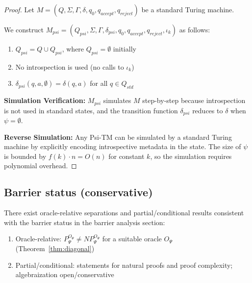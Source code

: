 \begin{proof}
Let $M = (Q, \Sigma, \Gamma, \delta, q_0, q_{accept}, q_{reject})$ be a standard Turing machine.

We construct $M_{psi} = (Q_{psi}, \Sigma, \Gamma, \delta_{psi}, q_0, q_{accept}, q_{reject}, \iota_k)$ as follows:

\begin{enumerate}
\item $Q_{psi} = Q \cup Q_{psi}$, where $Q_{psi} = \emptyset$ initially
\item No introspection is used (no calls to $\iota_k$)
\item $\delta_{psi}(q, a, \emptyset) = \delta(q, a)$ for all $q \in Q_{std}$
\end{enumerate}

\textbf{Simulation Verification:} 
$M_{psi}$ simulates $M$ step-by-step because introspection is not used in standard states, and the transition function $\delta_{psi}$ reduces to $\delta$ when $\psi = \emptyset$.

\textbf{Reverse Simulation:}
Any Psi-TM can be simulated by a standard Turing machine by explicitly encoding introspective metadata in the state. The size of $\psi$ is bounded by $f(k) \cdot n = O(n)$ for constant $k$, so the simulation requires polynomial overhead.
\end{proof}

\subsection{Barrier status (conservative)}

\begin{theorem}
There exist oracle-relative separations and partial/conditional results consistent with the barrier status in the barrier analysis section:
\begin{enumerate}
\item Oracle-relative: $P^{O_\Psi}_\Psi \neq NP^{O_\Psi}_\Psi$ for a suitable oracle $O_\Psi$ (Theorem~\ref{thm:diagonal})
\item Partial/conditional: statements for natural proofs and proof complexity; algebraization open/conservative
\end{enumerate}
\end{theorem}

